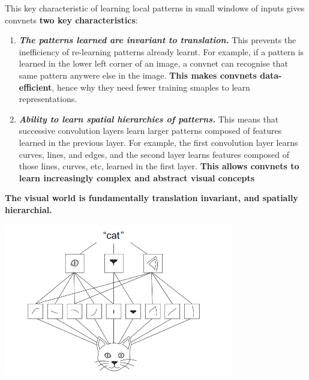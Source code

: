 \documentclass[12pt, a4paper]{article}
\begin{document}
This key characteristic of learning local patterns in small windows of inputs 
gives convnets \textbf{two key characteristics}:
\begin{enumerate}
   \item \textbf{\textit{The patterns learned are invariant to translation.}}
   This prevents the inefficiency of re-learning patterns already learnt. For example,
   if a pattern is learned in the lower left corner of an image, a convnet can recognise that 
   same pattern anywere else in the image. \textbf{This makes convnets data-efficient},
   hence why they need fewer training smaples to learn representations.

   \item \textbf{\textit{Ability to learn spatial hierarchies of patterns.}}
   This means that successive convolution layers learn larger patterns composed of features 
   learned in the previous layer. For example, the first convolution layer learns curves, lines, and edges, and the second 
   layer  learns features composed of those lines, curves, etc, learned in the first layer.
   \textbf{This allows convnets to learn increasingly complex and abstract visual concepts}
\end{enumerate}

\textbf{The visual world is fundamentally translation invariant, and spatially hierarchial.}

{
   \centering
   \includegraphics[width=10cm]{spatial_hierarchy_learning.png}

}
\end{document}
